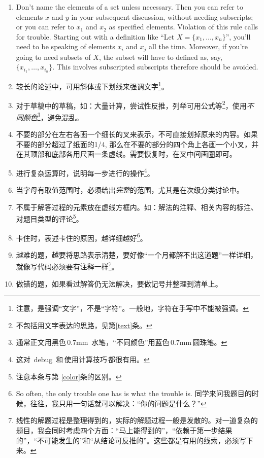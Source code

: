 \documentclass[11pt, a4paper, titlepage]{article}
\begin{document}
\begin{enumerate}
\item Don't name the elements of a set unless necessary. Then you can refer to elements $x$ and $y$ in your subsequent discussion, without needing subscripts; or you can refer to $x_{1}$ and $x_{2}$ as specified elements. Violation of this rule calls for trouble. Starting out with a definition like ``Let $X = \{x_{1},\dots ,x_{n}\}$'', you'll need to be speaking of elements $x_{i}$ and $x_{j}$ all the time. Moreover, if you're going to need subsets of $X$, the subset will have to defined as, say, $\{x_{{i}_{1}},\dots ,x_{{i}_{n}}\}$. This involves subscripted subscripts therefore should be avoided.

\item 较长的论述中，可用斜体或下划线来强调文字\footnote{注意，是强调“文字”，不是“字符”。一般地，字符在手写中不能被强调。}。

\item \label{color}对于草稿中的草稿，如：大量计算，尝试性反推，列举可用公式等\footnote{不包括用文字表达的思路，见第\ref{text}条。}，使用{\fontsize{11.5pt}{1}\color{blue}\emph{不同颜色}}\footnote{通常正文用黑色\,0.7mm\, 水笔，“不同颜色”用蓝色\,0.7mm\,圆珠笔。}，避免混乱。

\item 不要的部分在左右各画一个细长的叉来表示，不可直接划掉原来的内容。如果不要的部分超过了纸面的1/4, 那么在不要的部分的四个角上各画一个小叉，并在其顶部和底部各用尺画一条虚线。需要恢复时，在叉中间画圈即可。

\item 进行复杂运算时，说明每一步进行的操作\footnote{这对\ debug\ 和\,使用计算技巧\,都很有用。}。

\item 当字母有取值范围时，必须给出\emph{完整}的范围，尤其是在次级分类讨论中。

\item 不属于解答过程的元素放在虚线方框内。如：解法的注释、相关内容的标注、对题目类型的评论\footnote{注意本条与第
    \ref{color}条的区别。}。

\item 卡住时，表述卡住的原因，越详细越好\footnote{So often, the only trouble one has is what the trouble is. 同学来问我题目的时候，往往，我只用一句话就可以解决：“你的问题是什么？”}。

\item \label{text}越难的题，越要将思路表示清楚，要好像“一个月都解不出这道题”一样详细，就像写代码必须要有注释一样\footnote{线性的解题过程是整理得到的，实际的解题过程一般是发散的。对一道复杂的题目，我会同时考虑四个方面：“马上能得到的”，“依赖于第一步结果的”，“不可能发生的”和“从结论可反推的”。这些都是有用的线索，必须写下来。}。

\item 做错的题，如果看过解答仍无法解决，要做记号并整理到清单上。
\end{enumerate}
\end{document}

